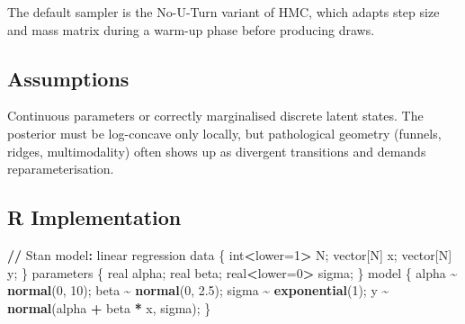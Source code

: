 \documentclass[
]{article}
\newenvironment{Shaded}{\begin{snugshade}}{\end{snugshade}}
\newcommand{\DecValTok}[1]{\textcolor[rgb]{0.00,0.00,0.81}{#1}}
\newcommand{\ErrorTok}[1]{\textcolor[rgb]{0.64,0.00,0.00}{\textbf{#1}}}
\newcommand{\FloatTok}[1]{\textcolor[rgb]{0.00,0.00,0.81}{#1}}
\newcommand{\FunctionTok}[1]{\textcolor[rgb]{0.13,0.29,0.53}{\textbf{#1}}}
\newcommand{\NormalTok}[1]{#1}
\newcommand{\OtherTok}[1]{\textcolor[rgb]{0.56,0.35,0.01}{#1}}
\newcommand{\SpecialCharTok}[1]{\textcolor[rgb]{0.81,0.36,0.00}{\textbf{#1}}}
\begin{document}
The default sampler is the No-U-Turn variant of HMC, which adapts step
size and mass matrix during a warm-up phase before producing draws.

\subsection{Assumptions}\label{assumptions}

Continuous parameters or correctly marginalised discrete latent states.
The posterior must be log-concave only locally, but pathological
geometry (funnels, ridges, multimodality) often shows up as divergent
transitions and demands reparameterisation.

\subsection{R Implementation}\label{r-implementation}

\begin{Shaded}
\begin{Highlighting}[]
\SpecialCharTok{/}\ErrorTok{/}\NormalTok{ Stan model}\SpecialCharTok{:}\NormalTok{ linear regression}
\NormalTok{data \{}
\NormalTok{  int}\SpecialCharTok{\textless{}}\NormalTok{lower}\OtherTok{=}\DecValTok{1}\SpecialCharTok{\textgreater{}}\NormalTok{ N;}
\NormalTok{  vector[N] x;}
\NormalTok{  vector[N] y;}
\NormalTok{\}}
\NormalTok{parameters \{}
\NormalTok{  real alpha;}
\NormalTok{  real beta;}
\NormalTok{  real}\SpecialCharTok{\textless{}}\NormalTok{lower}\OtherTok{=}\DecValTok{0}\SpecialCharTok{\textgreater{}}\NormalTok{ sigma;}
\NormalTok{\}}
\NormalTok{model \{}
\NormalTok{  alpha }\SpecialCharTok{\textasciitilde{}} \FunctionTok{normal}\NormalTok{(}\DecValTok{0}\NormalTok{, }\DecValTok{10}\NormalTok{);}
\NormalTok{  beta  }\SpecialCharTok{\textasciitilde{}} \FunctionTok{normal}\NormalTok{(}\DecValTok{0}\NormalTok{, }\FloatTok{2.5}\NormalTok{);}
\NormalTok{  sigma }\SpecialCharTok{\textasciitilde{}} \FunctionTok{exponential}\NormalTok{(}\DecValTok{1}\NormalTok{);}
\NormalTok{  y }\SpecialCharTok{\textasciitilde{}} \FunctionTok{normal}\NormalTok{(alpha }\SpecialCharTok{+}\NormalTok{ beta }\SpecialCharTok{*}\NormalTok{ x, sigma);}
\NormalTok{\}}
\end{Highlighting}
\end{Shaded}
\end{document}
